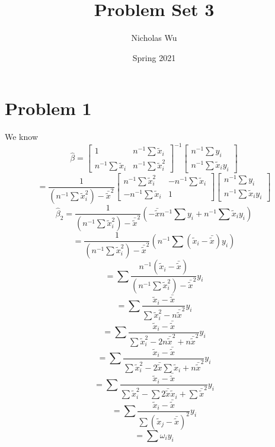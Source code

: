 \documentclass[10pt,letter]{article}
\begin{document}


\title{Problem Set 3}

\author{Nicholas Wu}

\date{Spring 2021}

\maketitle


\section*{Problem 1}
We know
\[ \hat\beta = \begin{bmatrix}
1 & n^{-1}\sum \tilde{x}_i \\
n^{-1}\sum \tilde{x}_i & n^{-1}\sum \tilde{x}_i^2
\end{bmatrix}^{-1} \begin{bmatrix}
 n^{-1}\sum y_i \\ n^{-1}\sum \tilde{x}_iy_i
\end{bmatrix}  \]
\[ = \frac{1}{(n^{-1}\sum \tilde{x}_i^2 )- \bar{\tilde{x}}^2}\begin{bmatrix}
n^{-1}\sum \tilde{x}_i^2 & -n^{-1}\sum \tilde{x}_i \\
-n^{-1}\sum \tilde{x}_i & 1
\end{bmatrix} \begin{bmatrix}
 n^{-1}\sum y_i \\ n^{-1}\sum \tilde{x}_iy_i
\end{bmatrix}  \]
\[ \hat{\beta}_2 = \frac{1}{(n^{-1}\sum \tilde{x}_i^2 )- \bar{\tilde{x}}^2}\left( -\bar{\tilde{x}}n^{-1}\sum y_i + n^{-1}\sum \tilde{x}_iy_i \right) \]
\[  = \frac{1}{(n^{-1}\sum \tilde{x}_i^2 )- \bar{\tilde{x}}^2}\left(  n^{-1}\sum ( \tilde{x}_i-\bar{\tilde{x}})y_i \right) \]
\[  = \sum \frac{n^{-1}(\tilde{x}_i-\bar{\tilde{x}}) }{(n^{-1}\sum \tilde{x}_i^2 )- \bar{\tilde{x}}^2} y_i \]
\[  = \sum \frac{\tilde{x}_i-\bar{\tilde{x}} }{\sum \tilde{x}_i^2 - n\bar{\tilde{x}}^2} y_i \]
\[  = \sum \frac{\tilde{x}_i-\bar{\tilde{x}} }{\sum \tilde{x}_i^2 - 2n\bar{\tilde{x}}^2 + n\bar{\tilde{x}}^2} y_i \]
\[  = \sum \frac{\tilde{x}_i-\bar{\tilde{x}} }{\sum \tilde{x}_i^2 - 2\bar{\tilde{x}}\sum \tilde{x}_i + n\bar{\tilde{x}}^2} y_i \]
\[  = \sum \frac{\tilde{x}_i-\bar{\tilde{x}} }{\sum \tilde{x}_i^2 - \sum 2\bar{\tilde{x}}\tilde{x}_i + \sum \bar{\tilde{x}}^2} y_i \]
\[  = \sum \frac{\tilde{x}_i-\bar{\tilde{x}} }{\sum (\tilde{x}_j - \bar{\tilde{x}})^2} y_i \]
\[  = \sum \omega_i y_i \]
\end{document}
